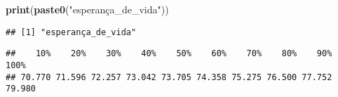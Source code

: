 \documentclass[
]{article}
\newenvironment{Shaded}{\begin{snugshade}}{\end{snugshade}}
\newcommand{\AttributeTok}[1]{\textcolor[rgb]{0.13,0.29,0.53}{#1}}
\newcommand{\DecValTok}[1]{\textcolor[rgb]{0.00,0.00,0.81}{#1}}
\newcommand{\FunctionTok}[1]{\textcolor[rgb]{0.13,0.29,0.53}{\textbf{#1}}}
\newcommand{\NormalTok}[1]{#1}
\newcommand{\SpecialCharTok}[1]{\textcolor[rgb]{0.81,0.36,0.00}{\textbf{#1}}}
\newcommand{\StringTok}[1]{\textcolor[rgb]{0.31,0.60,0.02}{#1}}
\begin{document}
\begin{Shaded}
\begin{Highlighting}[]
\FunctionTok{print}\NormalTok{(}\FunctionTok{paste0}\NormalTok{(}\StringTok{"esperança\_de\_vida"}\NormalTok{))}
\end{Highlighting}
\end{Shaded}

\begin{verbatim}
## [1] "esperança_de_vida"
\end{verbatim}

\begin{Shaded}
\end{Shaded}

\begin{verbatim}
##    10%    20%    30%    40%    50%    60%    70%    80%    90%   100% 
## 70.770 71.596 72.257 73.042 73.705 74.358 75.275 76.500 77.752 79.980
\end{verbatim}

\begin{Shaded}
\end{Shaded}
\end{document}
